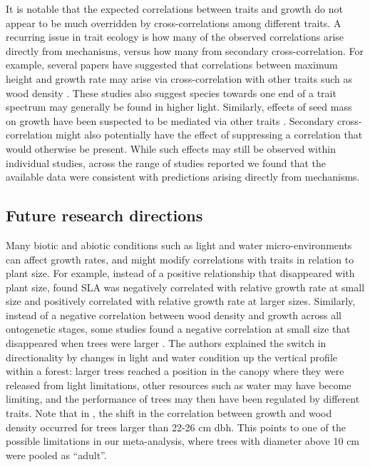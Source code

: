 \documentclass[a4paper,11pt]{article}
\begin{document}
It is notable that the expected correlations between traits and growth do not appear to be much overridden by cross-correlations among different traits. A recurring issue in trait ecology is how many of the observed correlations arise directly from mechanisms, versus how many from secondary cross-correlation. For example, several papers have suggested that correlations between maximum height and growth rate may arise via cross-correlation with other traits such as wood density \citep{Thomas:1996do, Poorter:2006vb, Wright:2010tp}. These studies also suggest species towards one end of a trait spectrum may generally be found in higher light. Similarly, effects of seed mass on growth have been suspected to be mediated via other traits \citep{Shipley:1990js,Westoby:2002ft,Poorter:2006vb}. Secondary cross-correlation might also potentially have the effect of suppressing a correlation that would otherwise be present. While such effects may still be observed within individual studies, across the range of studies reported we found that the available data were consistent with predictions arising directly from mechanisms.

\subsection*{Future research directions}

Many biotic and abiotic conditions such as light and water micro-environments can affect growth rates, and might modify correlations with traits in relation to plant size. For example, instead of a positive relationship that disappeared with plant size, \citet{Iida:2014ep} found SLA was negatively correlated with relative growth rate at small size and positively correlated with relative growth rate at larger sizes. Similarly, instead of a negative correlation between wood density and growth across all ontogenetic stages, some studies found a negative correlation at small size that disappeared when trees were larger \citep{Iida:2014ep,Iida:2014hq}. The authors explained the switch in directionality by changes in light and water condition up the vertical profile within a forest: larger trees reached a position in the canopy where they were released from light limitations, other resources such as water may have become limiting, and the performance of trees may then have been regulated by different traits. Note that in \citet{Iida:2014hq}, the shift in the correlation between growth and wood density occurred for trees larger than 22-26 cm dbh. This points to one of the possible limitations in our meta-analysis, where trees with diameter above 10 cm were pooled as ``adult''.
\end{document}

